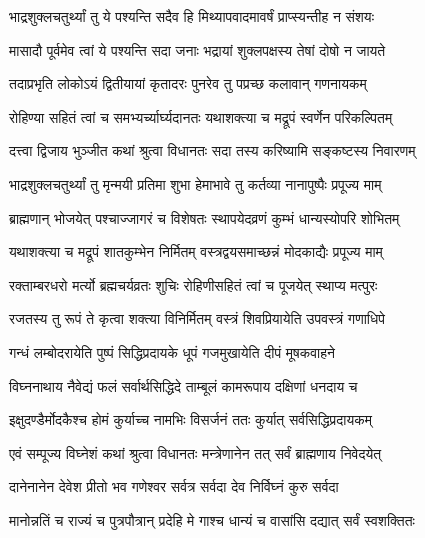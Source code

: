 \twolineshloka
{भाद्रशुक्लचतुर्थ्यां तु ये पश्यन्ति सदैव हि}
{मिथ्यापवादमावर्षं प्राप्स्यन्तीह न संशयः}%

\twolineshloka
{मासादौ पूर्वमेव त्वां ये पश्यन्ति सदा जनाः}
{भद्रायां शुक्लपक्षस्य तेषां दोषो न जायते}%

\twolineshloka
{तदाप्रभृति लोकोऽयं द्वितीयायां कृतादरः}
{पुनरेव तु पप्रच्छ कलावान् गणनायकम्}%



\twolineshloka
{रोहिण्या सहितं त्वां च समभ्यर्च्यार्घ्यदानतः}
{यथाशक्त्या च मद्रूपं स्वर्णेन परिकल्पितम्}%

\twolineshloka
{दत्त्वा द्विजाय भुञ्जीत कथां श्रुत्वा विधानतः}
{सदा तस्य करिष्यामि सङ्कष्टस्य निवारणम्}%

\twolineshloka
{भाद्रशुक्लचतुर्थ्यां तु मृन्मयी प्रतिमा शुभा}
{हेमाभावे तु कर्तव्या नानापुष्पैः प्रपूज्य माम्}%

\twolineshloka
{ब्राह्मणान् भोजयेत् पश्चाज्जागरं च विशेषतः}
{स्थापयेदव्रणं कुम्भं धान्यस्योपरि शोभितम्}%

\twolineshloka
{यथाशक्त्या च मद्रूपं शातकुम्भेन निर्मितम्}
{वस्त्रद्वयसमाच्छन्नं मोदकाद्यैः प्रपूज्य माम्}%

\twolineshloka
{रक्ताम्बरधरो मर्त्यो ब्रह्मचर्यव्रतः शुचिः}
{रोहिणीसहितं त्वां च पूजयेत् स्थाप्य मत्पुरः}%

\twolineshloka
{रजतस्य तु रूपं ते कृत्वा शक्त्या विनिर्मितम्}
{वस्त्रं शिवप्रियायेति उपवस्त्रं गणाधिपे}%

\twolineshloka
{गन्धं लम्बोदरायेति पुष्पं सिद्धिप्रदायके}
{धूपं गजमुखायेति दीपं मूषकवाहने}%

\twolineshloka
{विघ्ननाथाय नैवेद्यं फलं सर्वार्थसिद्धिदे}
{ताम्बूलं कामरूपाय दक्षिणां धनदाय च}%

\twolineshloka
{इक्षुदण्डैर्मोदकैश्च होमं कुर्याच्च नामभिः}
{विसर्जनं ततः कुर्यात् सर्वसिद्धिप्रदायकम्}%

\twolineshloka
{एवं सम्पूज्य विघ्नेशं कथां श्रुत्वा विधानतः}
{मन्त्रेणानेन तत् सर्वं ब्राह्मणाय निवेदयेत्}%

\twolineshloka
{दानेनानेन देवेश प्रीतो भव गणेश्वर}
{सर्वत्र सर्वदा देव निर्विघ्नं कुरु सर्वदा}%

\twolineshloka
{मानोन्नतिं च राज्यं च पुत्रपौत्रान् प्रदेहि मे}
{गाश्च धान्यं च वासांसि दद्यात् सर्वं स्वशक्तितः}%

